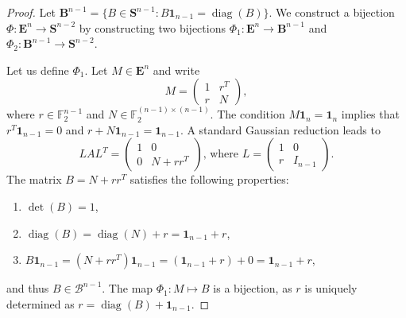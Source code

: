 \documentclass{amsart}
\theoremstyle{definition}
\theoremstyle{remark}
\def\FF{\mathbb{F}}
\def\S{\boldsymbol{S}}
\def\E{\boldsymbol{E}}
\def\B{\boldsymbol{B}}
\DeclareMathOperator{\diag}{diag}
\newcommand{\Ones}{\mathbf{1}}
\begin{document}
\begin{proof}
    Let $\B^{n-1}=\{B\in \S^{n-1}\colon B\Ones_{n-1} = \diag(B)\}$. We construct a bijection $\Phi\colon \E^n \to \S^{n-2}$ by constructing two bijections $\Phi_1: \E^n \to \B^{n-1}$ and $\Phi_2: \B^{n-1} \to \S^{n-2}$.
    
    Let us define $\Phi_1$. Let $M \in \E^n$ and write 
    \[
        M = \left( \begin{array}{c|c} 1 & r^T \\\hline r & N \end{array} \right),
    \]
    where $r\in \FF_2^{n-1}$ and $N\in \FF_2^{(n-1)\times (n-1)}$. The condition $M\Ones_n = \Ones_n$ implies that $r^T \Ones_{n-1} = 0$ and $r + N \Ones_{n-1} = \Ones_{n-1}$.
    A standard Gaussian reduction leads to
    \[
        L A L^T = \left( \begin{array}{c|c} 1 & 0 \\\hline 0 & N+rr^T \end{array} \right)\text{, where } L = \left( \begin{array}{c|c} 1 & 0 \\\hline r & I_{n-1} \end{array} \right).
    \]
    The matrix $B=  N + rr^T$ satisfies the following properties:
    \begin{enumerate}
        \item $\det(B)=1$,
        \item $\diag(B) = \diag(N) + r = \Ones_{n-1} + r$,
        \item $B\Ones_{n-1} = (N+rr^T)\Ones_{n-1} = (\Ones_{n-1}+r) + 0 = \Ones_{n-1} + r$,
    \end{enumerate}
    and thus $B\in \mathcal{B}^{n-1}$. The map $\Phi_1: M \mapsto B$ is a bijection, as $r$ is uniquely determined as $r = \diag(B) + \Ones_{n-1}$.
    

\end{proof}
\end{document}
